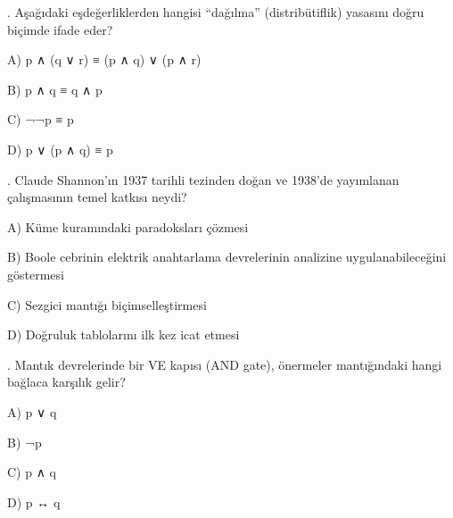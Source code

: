 \par\smallskip{}. Aşağıdaki eşdeğerliklerden hangisi “dağılma” (distribütiflik) yasasını doğru biçimde ifade eder?

\par\noindent\hspace*{1.6em}A) p ∧ (q ∨ r) ≡ (p ∧ q) ∨ (p ∧ r)

\par\noindent\hspace*{1.6em}B) p ∧ q ≡ q ∧ p

\par\noindent\hspace*{1.6em}C) ¬¬p ≡ p

\par\noindent\hspace*{1.6em}D) p ∨ (p ∧ q) ≡ p

\par\smallskip{}. Claude Shannon’ın 1937 tarihli tezinden doğan ve 1938’de yayımlanan çalışmasının temel katkısı neydi?

\par\noindent\hspace*{1.6em}A) Küme kuramındaki paradoksları çözmesi

\par\noindent\hspace*{1.6em}B) Boole cebrinin elektrik anahtarlama devrelerinin analizine uygulanabileceğini göstermesi

\par\noindent\hspace*{1.6em}C) Sezgici mantığı biçimselleştirmesi

\par\noindent\hspace*{1.6em}D) Doğruluk tablolarını ilk kez icat etmesi

\par\smallskip{}. Mantık devrelerinde bir VE kapısı (AND gate), önermeler mantığındaki hangi bağlaca karşılık gelir?

\par\noindent\hspace*{1.6em}A) p ∨ q

\par\noindent\hspace*{1.6em}B) ¬p

\par\noindent\hspace*{1.6em}C) p ∧ q

\par\noindent\hspace*{1.6em}D) p ↔ q

